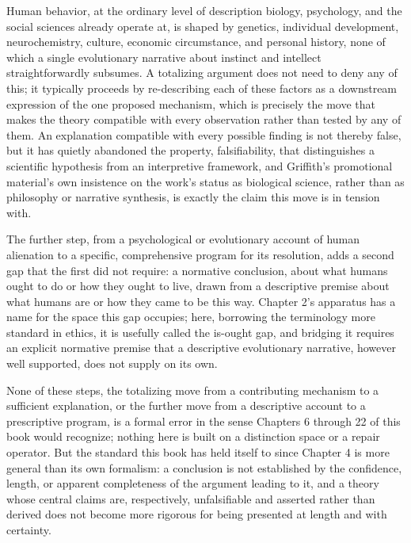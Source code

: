 \documentclass[11pt]{book}
\begin{document}
Human behavior, at the ordinary level of description biology, psychology, and the social sciences already operate at, is shaped by genetics, individual development, neurochemistry, culture, economic circumstance, and personal history, none of which a single evolutionary narrative about instinct and intellect straightforwardly subsumes. A totalizing argument does not need to deny any of this; it typically proceeds by re-describing each of these factors as a downstream expression of the one proposed mechanism, which is precisely the move that makes the theory compatible with every observation rather than tested by any of them. An explanation compatible with every possible finding is not thereby false, but it has quietly abandoned the property, falsifiability, that distinguishes a scientific hypothesis from an interpretive framework, and Griffith's promotional material's own insistence on the work's status as biological science, rather than as philosophy or narrative synthesis, is exactly the claim this move is in tension with.

The further step, from a psychological or evolutionary account of human alienation to a specific, comprehensive program for its resolution, adds a second gap that the first did not require: a normative conclusion, about what humans ought to do or how they ought to live, drawn from a descriptive premise about what humans are or how they came to be this way. Chapter 2's apparatus has a name for the space this gap occupies; here, borrowing the terminology more standard in ethics, it is usefully called the is-ought gap, and bridging it requires an explicit normative premise that a descriptive evolutionary narrative, however well supported, does not supply on its own.

None of these steps, the totalizing move from a contributing mechanism to a sufficient explanation, or the further move from a descriptive account to a prescriptive program, is a formal error in the sense Chapters 6 through 22 of this book would recognize; nothing here is built on a distinction space or a repair operator. But the standard this book has held itself to since Chapter 4 is more general than its own formalism: a conclusion is not established by the confidence, length, or apparent completeness of the argument leading to it, and a theory whose central claims are, respectively, unfalsifiable and asserted rather than derived does not become more rigorous for being presented at length and with certainty.
\end{document}
